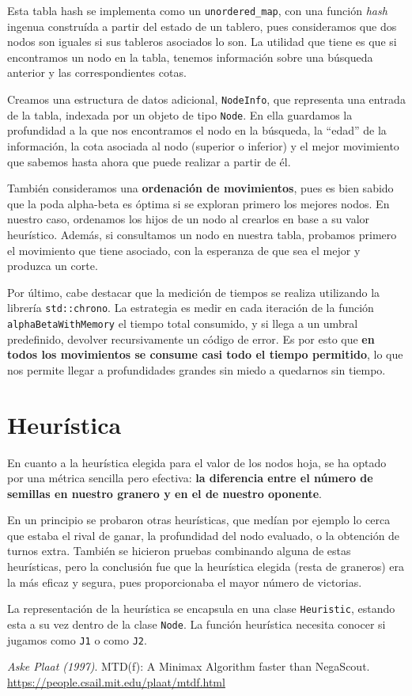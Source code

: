\documentclass[11pt,a4paper]{article}
\begin{document}
Esta tabla hash se implementa como un \verb|unordered_map|, con una función \textit{hash} ingenua construída a partir del estado de un tablero, pues consideramos que dos nodos son iguales si sus tableros asociados lo son. La utilidad que tiene es que si encontramos un nodo en la tabla, tenemos información sobre una búsqueda anterior y las correspondientes cotas.

Creamos una estructura de datos adicional, \verb|NodeInfo|, que representa una entrada de la tabla, indexada por un objeto de tipo \verb|Node|. En ella guardamos la profundidad a la que nos encontramos el nodo en la búsqueda, la ``edad'' de la información, la cota asociada al nodo (superior o inferior) y el mejor movimiento que sabemos hasta ahora que puede realizar a partir de él.

También consideramos una \textbf{ordenación de movimientos}, pues es bien sabido que la poda alpha-beta es óptima si se exploran primero los mejores nodos. En nuestro caso, ordenamos los hijos de un nodo al crearlos en base a su valor heurístico. Además, si consultamos un nodo en nuestra tabla, probamos primero el movimiento que tiene asociado, con la esperanza de que sea el mejor y produzca un corte.

Por último, cabe destacar que la medición de tiempos se realiza utilizando la librería \verb|std::chrono|. La estrategia es medir en cada iteración de la función \verb|alphaBetaWithMemory| el tiempo total consumido, y si llega a un umbral predefinido, devolver recursivamente un código de error. Es por esto que \textbf{en todos los movimientos se consume casi todo el tiempo permitido}, lo que nos permite llegar a profundidades grandes sin miedo a quedarnos sin tiempo.

\section{Heurística}

En cuanto a la heurística elegida para el valor de los nodos hoja, se ha optado por una métrica sencilla pero efectiva: \textbf{la diferencia entre el número de semillas en nuestro granero y en el de nuestro oponente}. 

En un principio se probaron otras heurísticas, que medían por ejemplo lo cerca que estaba el rival de ganar, la profundidad del nodo evaluado, o la obtención de turnos extra. También se hicieron pruebas combinando alguna de estas heurísticas, pero la conclusión fue que la heurística elegida (resta de graneros) era la más eficaz y segura, pues proporcionaba el mayor número de victorias.

La representación de la heurística se encapsula en una clase \verb|Heuristic|, estando esta a su vez dentro de la clase \verb|Node|. La función heurística necesita conocer si jugamos como \verb|J1| o como \verb|J2|. 


\begin{thebibliography}{9}

\textit{Aske Plaat (1997)}. MTD(f): A Minimax Algorithm faster than NegaScout. \\ \url{https://people.csail.mit.edu/plaat/mtdf.html}

\end{thebibliography}
\end{document}
